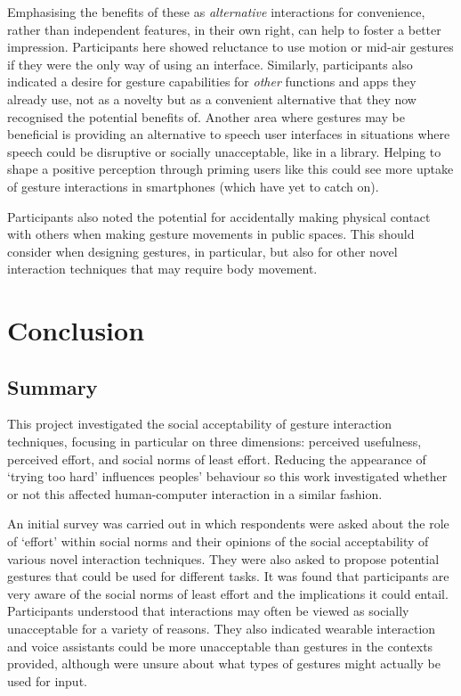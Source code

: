 \documentclass{l4proj}
\begin{document}
Emphasising the benefits of these as \textit{alternative} interactions for convenience, rather than independent features, in their own right, can help to foster a better impression. Participants here showed reluctance to use motion or mid-air gestures if they were the only way of using an interface. Similarly, participants also indicated a desire for gesture capabilities for \textit{other} functions and apps they already use, not as a novelty but as a convenient alternative that they now recognised the potential benefits of. Another area where gestures may be beneficial is providing an alternative to speech user interfaces in situations where speech could be disruptive or socially unacceptable, like in a library. Helping to shape a positive perception through priming users like this could see more uptake of gesture interactions in smartphones (which have yet to catch on).

Participants also noted the potential for accidentally making physical contact with others when making gesture movements in public spaces. This should consider when designing gestures, in particular, but also for other novel interaction techniques that may require body movement.


\chapter{Conclusion}  

\section{Summary}
This project investigated the social acceptability of gesture interaction techniques, focusing in particular on three dimensions: perceived usefulness, perceived effort, and social norms of least effort. Reducing the appearance of `trying too hard' influences peoples' behaviour so this work investigated whether or not this affected human-computer interaction in a similar fashion.

An initial survey was carried out in which respondents were asked about the role of `effort' within social norms and their opinions of the social acceptability of various novel interaction techniques. They were also asked to propose potential gestures that could be used for different tasks. It was found that participants are very aware of the social norms of least effort and the implications it could entail. Participants understood that interactions may often be viewed as socially unacceptable for a variety of reasons. They also indicated wearable interaction and voice assistants could be more unacceptable than gestures in the contexts provided, although were unsure about what types of gestures might actually be used for input.
\end{document}
